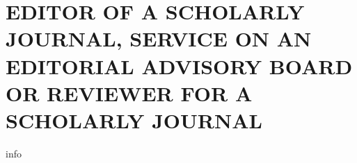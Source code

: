 \section{EDITOR OF A SCHOLARLY JOURNAL, SERVICE ON AN EDITORIAL
  ADVISORY BOARD OR REVIEWER FOR A SCHOLARLY JOURNAL}
{{info}}